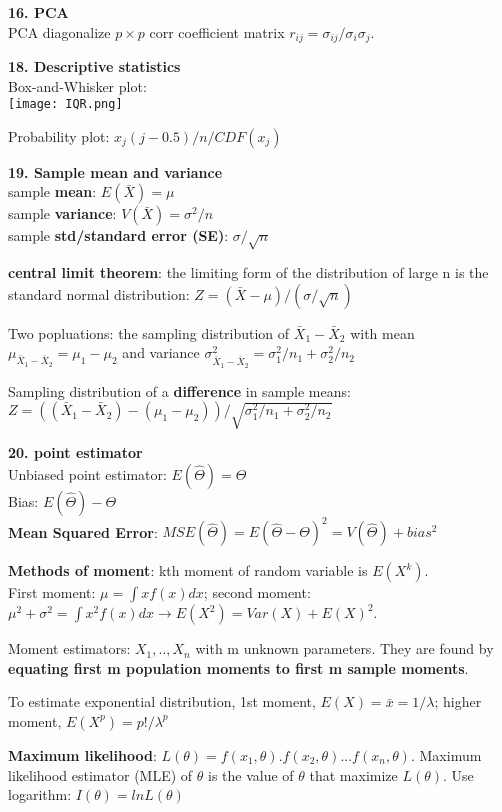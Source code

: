 \documentclass[a4paper,10pt,twocolumn]{article}
\begin{document}
\textbf{16. PCA}\\
PCA diagonalize $p\times p$ corr coefficient matrix $r_{ij}=\sigma_{ij}/\sigma_i\sigma_j$. 

\textbf{18. Descriptive statistics}\\
Box-and-Whisker plot: \\
\texttt{[image: IQR.png]}

Probability plot: $x_j(j-0.5)/n/CDF(x_j)$

\textbf{19. Sample mean and variance}\\
sample \textbf{mean}: $E(\bar{X})=\mu$\\
sample \textbf{variance}: $V(\bar{X})=\sigma^2/n$ \\
sample \textbf{std/standard error (SE)}: $\sigma/\sqrt{n}$

\textbf{central limit theorem}: the limiting form of the distribution of large n is the standard normal distribution: $Z=(\bar{X}-\mu)/(\sigma/\sqrt{n})$

Two popluations: the sampling distribution of $\bar{X}_1-\bar{X}_2$ with mean $\mu_{\bar{X}_1-\bar{X}_2}=\mu_1-\mu_2$ and variance $\sigma^2_{\bar{X}_1-\bar{X}_2}=\sigma_1^2/n_1+\sigma_2^2/n_2$ 

Sampling distribution of a \textbf{difference} in sample means: $Z=((\bar{X}_1-\bar{X}_2)-(\mu_1-\mu_2))/\sqrt{\sigma_1^2/n_1+\sigma_2^2/n_2}$

\textbf{20. point estimator}\\
Unbiased point estimator: $E(\hat{\Theta})=\Theta$\\
Bias: $E(\hat{\Theta})-\Theta$\\
\textbf{Mean Squared Error}: $MSE(\hat{\Theta})=E(\hat{\Theta}-\Theta)^2=V(\hat{\Theta})+bias^2$

\textbf{Methods of moment}: kth moment of random variable is $E(X^k)$.\\
First moment: $\mu=\int xf(x)dx$; second moment: $\mu^2+\sigma^2=\int x^2f(x)dx \rightarrow E(X^2)=Var(X)+E(X)^2$.

Moment estimators: $X_1,..,X_n$ with m unknown parameters. They are found by \textbf{equating first m population moments to first m sample moments}.

To estimate exponential distribution, 1st moment, $E(X)=\bar{x}=1/\lambda$; higher moment, $E(X^p)=p!/\lambda^p$

\textbf{Maximum likelihood}: $L(\theta)=f(x_1, \theta).f(x_2, \theta)...f(x_n,\theta)$. Maximum likelihood estimator (MLE) of $\theta$ is the value of $\theta$ that maximize $L(\theta)$. Use logarithm: $I(\theta)=ln L(\theta)$
\end{document}
